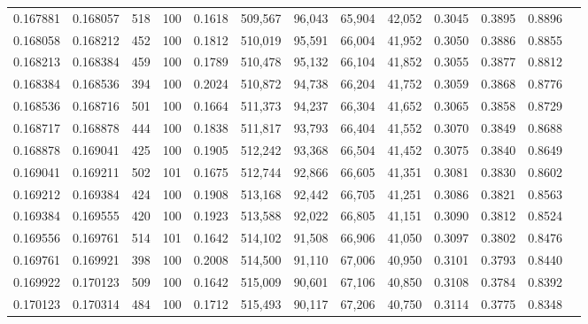\begin{tabular}{rrrrrrrrrrrrr}
0.167881 & 0.168057 &   518 & 100 &                                     0.1618 & 509,567 &  96,043 &  65,904 &  42,052 & 0.3045 & 0.3895 & 0.8896 \\
0.168058 & 0.168212 &   452 & 100 &                                     0.1812 & 510,019 &  95,591 &  66,004 &  41,952 & 0.3050 & 0.3886 & 0.8855 \\
0.168213 & 0.168384 &   459 & 100 &                                     0.1789 & 510,478 &  95,132 &  66,104 &  41,852 & 0.3055 & 0.3877 & 0.8812 \\
0.168384 & 0.168536 &   394 & 100 &                                     0.2024 & 510,872 &  94,738 &  66,204 &  41,752 & 0.3059 & 0.3868 & 0.8776 \\
0.168536 & 0.168716 &   501 & 100 &                                     0.1664 & 511,373 &  94,237 &  66,304 &  41,652 & 0.3065 & 0.3858 & 0.8729 \\
0.168717 & 0.168878 &   444 & 100 &                                     0.1838 & 511,817 &  93,793 &  66,404 &  41,552 & 0.3070 & 0.3849 & 0.8688 \\
0.168878 & 0.169041 &   425 & 100 &                                     0.1905 & 512,242 &  93,368 &  66,504 &  41,452 & 0.3075 & 0.3840 & 0.8649 \\
0.169041 & 0.169211 &   502 & 101 &                                     0.1675 & 512,744 &  92,866 &  66,605 &  41,351 & 0.3081 & 0.3830 & 0.8602 \\
0.169212 & 0.169384 &   424 & 100 &                                     0.1908 & 513,168 &  92,442 &  66,705 &  41,251 & 0.3086 & 0.3821 & 0.8563 \\
0.169384 & 0.169555 &   420 & 100 &                                     0.1923 & 513,588 &  92,022 &  66,805 &  41,151 & 0.3090 & 0.3812 & 0.8524 \\
0.169556 & 0.169761 &   514 & 101 &                                     0.1642 & 514,102 &  91,508 &  66,906 &  41,050 & 0.3097 & 0.3802 & 0.8476 \\
0.169761 & 0.169921 &   398 & 100 &                                     0.2008 & 514,500 &  91,110 &  67,006 &  40,950 & 0.3101 & 0.3793 & 0.8440 \\
0.169922 & 0.170123 &   509 & 100 &                                     0.1642 & 515,009 &  90,601 &  67,106 &  40,850 & 0.3108 & 0.3784 & 0.8392 \\
0.170123 & 0.170314 &   484 & 100 &                                     0.1712 & 515,493 &  90,117 &  67,206 &  40,750 & 0.3114 & 0.3775 & 0.8348 \\

\end{tabular}
